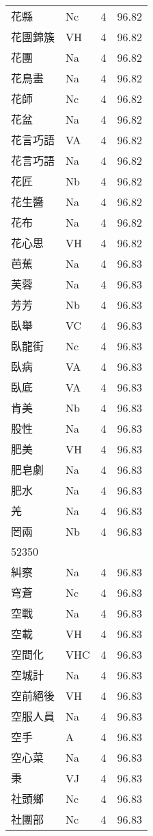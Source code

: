 \documentclass[twocolumn]{book}
\begin{document}
\begin{supertabular}{llrr}
花縣 & Nc & 4 &  96.82\\
花團錦簇 & VH & 4 &  96.82\\
花團 & Na & 4 &  96.82\\
花鳥畫 & Na & 4 &  96.82\\
花師 & Nc & 4 &  96.82\\
花盆 & Na & 4 &  96.82\\
花言巧語 & VA & 4 &  96.82\\
花言巧語 & Na & 4 &  96.82\\
花匠 & Nb & 4 &  96.82\\
花生醬 & Na & 4 &  96.82\\
花布 & Na & 4 &  96.82\\
花心思 & VH & 4 &  96.82\\
芭蕉 & Na & 4 &  96.83\\
芙蓉 & Na & 4 &  96.83\\
芳芳 & Nb & 4 &  96.83\\
臥舉 & VC & 4 &  96.83\\
臥龍街 & Nc & 4 &  96.83\\
臥病 & VA & 4 &  96.83\\
臥底 & VA & 4 &  96.83\\
肯美 & Nb & 4 &  96.83\\
股性 & Na & 4 &  96.83\\
肥美 & VH & 4 &  96.83\\
肥皂劇 & Na & 4 &  96.83\\
肥水 & Na & 4 &  96.83\\
羌 & Na & 4 &  96.83\\
罔兩 & Nb & 4 &  96.83\\
52350\\
糾察 & Na & 4 &  96.83\\
穹蒼 & Nc & 4 &  96.83\\
空戰 & Na & 4 &  96.83\\
空載 & VH & 4 &  96.83\\
空間化 & VHC & 4 &  96.83\\
空城計 & Na & 4 &  96.83\\
空前絕後 & VH & 4 &  96.83\\
空服人員 & Na & 4 &  96.83\\
空手 & A & 4 &  96.83\\
空心菜 & Na & 4 &  96.83\\
秉 & VJ & 4 &  96.83\\
社頭鄉 & Nc & 4 &  96.83\\
社團部 & Nc & 4 &  96.83\\

\end{supertabular}
\end{document}
